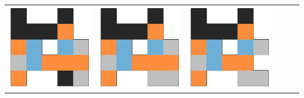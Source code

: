 \begin{tabular}{cccccc}
    \hline \rule{0pt}{9ex}  
    \includegraphics[scale=0.1]{images/top_designs/pusher/ga/exp5/gen29_ind0} &
    \includegraphics[scale=0.1]{images/top_designs/pusher/ga/exp5/gen29_ind1} &
    \includegraphics[scale=0.1]{images/top_designs/pusher/ga/exp5/gen29_ind2} &

\end{tabular}
